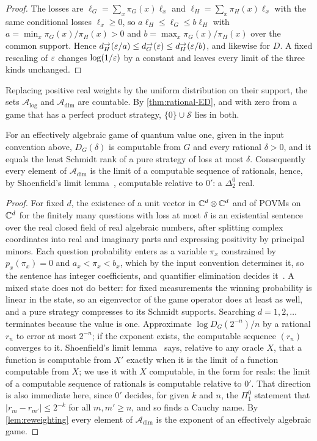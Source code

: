 \begin{proof}
The losses are $\ell_G=\sum_x\pi_G(x)\ell_x$ and $\ell_H=\sum_x\pi_H(x)\ell_x$ with the same conditional losses $\ell_x\ge0$, so $a\ell_H\le\ell_G\le
b\ell_H$ with $a=\min_x\pi_G(x)/\pi_H(x)>0$ and $b=\max_x\pi_G(x)/\pi_H(x)$ over the common support. Hence
$d_H^\to(\varepsilon/a)\le d_G^\to(\varepsilon)\le d_H^\to(\varepsilon/b)$, and likewise for $D$. A fixed rescaling of $\varepsilon$ changes $\log(1/\varepsilon)$ by a constant
and leaves every limit of the three kinds unchanged.
\end{proof}

Replacing positive real weights by the uniform distribution on their support, the sets $\mathcal A_{\log}$ and $\mathcal A_{\dim}$ are countable.
By \cref{thm:rational-ED}, and with zero from a game that has a perfect product strategy, $\{0\}\cup\mathcal S$ lies in both.

\begin{proposition}\label{prop:arithmetic-dim}
For an effectively algebraic game of quantum value one, given in the input convention above, $D_G(\delta)$ is computable from $G$ and every
rational $\delta>0$, and it equals the least Schmidt rank of a pure strategy of loss at most $\delta$. Consequently every element of
$\mathcal A_{\dim}$ is the limit of a computable sequence of rationals, hence, by Shoenfield's limit lemma~\cite{Sho59}, computable relative to
$0'$: a $\Delta^0_2$ real.
\end{proposition}

\begin{proof}
For fixed $d$, the existence of a unit vector in $\mathbb C^d\otimes\mathbb C^d$ and of POVMs on $\mathbb C^d$ for the finitely many questions with loss at most
$\delta$ is an existential sentence over the real closed field of real algebraic numbers, after splitting complex coordinates into real
and imaginary parts and expressing positivity by principal minors. Each question probability enters as a variable $\pi_x$ constrained by
$p_x(\pi_x)=0$ and $a_x<\pi_x<b_x$, which by the input convention determines it, so the sentence has integer coefficients, and quantifier
elimination decides it~\cite{Sei54,CM12}. A mixed state does not do better: for fixed measurements the winning probability is linear in the
state, so an eigenvector of the game operator does at least as well, and a pure strategy compresses to its Schmidt supports. Searching
$d=1,2,\dots$ terminates because the value is one. Approximate $\log D_G(2^{-n})/n$ by a rational $r_n$ to error at most $2^{-n}$; if the
exponent exists, the computable sequence $(r_n)$ converges to it. Shoenfield's limit lemma~\cite{Sho59} says, relative to any oracle $X$,
that a function is computable from $X'$ exactly when it is the limit of a function computable from $X$; we use it with $X$ computable, in
the form for reals: the limit of a computable sequence of rationals is computable relative to $0'$. That direction is also immediate here,
since $0'$ decides, for given $k$ and $n$, the $\Pi^0_1$ statement that $|r_m-r_{m'}|\le2^{-k}$ for all $m,m'\ge n$, and so finds a Cauchy
name. By \cref{lem:reweighting} every element of $\mathcal A_{\dim}$ is the exponent of an effectively algebraic game.
\end{proof}

